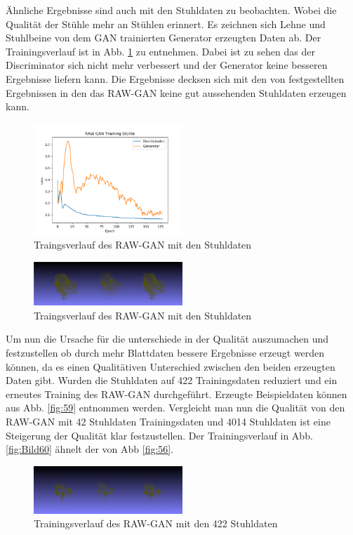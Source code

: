 \documentclass{llncs}
\begin{document}
Ähnliche Ergebnisse sind auch mit den Stuhldaten zu beobachten. Wobei die Qualität der Stühle mehr an Stühlen erinnert. Es zeichnen sich Lehne und Stuhlbeine von dem GAN trainierten Generator erzeugten Daten ab. Der Trainingsverlauf ist in Abb. \ref{fig:Bild57} zu entnehmen. Dabei ist zu sehen das der Discriminator sich nicht mehr verbessert und der Generator keine besseren Ergebnisse liefern kann. Die Ergebnisse decksen sich mit den von \cite{3dgan} festgestellten Ergebnissen in den das RAW-GAN keine gut aussehenden Stuhldaten erzeugen kann. 
\begin{figure}[htbp] 
	\centering
	\includegraphics[width=0.5\textwidth]{raw_gan_chair_result.png}
	\caption{Traingsverlauf des RAW-GAN mit den Stuhldaten}
	\label{fig:Bild57}
\end{figure}
\begin{figure}[htbp] 
	\centering
	\includegraphics[width=0.5\textwidth]{raw_gan_chair_example.png}
	\caption{Traingsverlauf des RAW-GAN mit den Stuhldaten}
	\label{fig:Bild58}
\end{figure}
Um nun die Ursache für die unterschiede in der Qualität auszumachen und festzustellen ob durch mehr Blattdaten bessere Ergebnisse erzeugt werden können, da es einen Qualitätiven Unterschied zwischen den beiden erzeugten Daten gibt. Wurden  die Stuhldaten auf 422 Trainingsdaten reduziert und ein erneutes Training des RAW-GAN durchgeführt.  Erzeugte Beispieldaten können aus Abb. \ref{fig:59} entnommen werden. Vergleicht man nun die Qualität von den RAW-GAN mit 42 Stuhldaten Trainingsdaten und 
4014 Stuhldaten ist eine Steigerung der Qualität klar festzustellen. Der Trainingsverlauf in Abb. \ref{fig:Bild60} ähnelt der von Abb \ref{fig:56}.
\begin{figure}[htbp] 
	\centering
	\includegraphics[width=0.5\textwidth]{raw_gan_result_400_result.png}
	\caption{Trainingsverlauf des RAW-GAN mit den 422 Stuhldaten}
	\label{fig:Bild59}
\end{figure}
\end{document}
